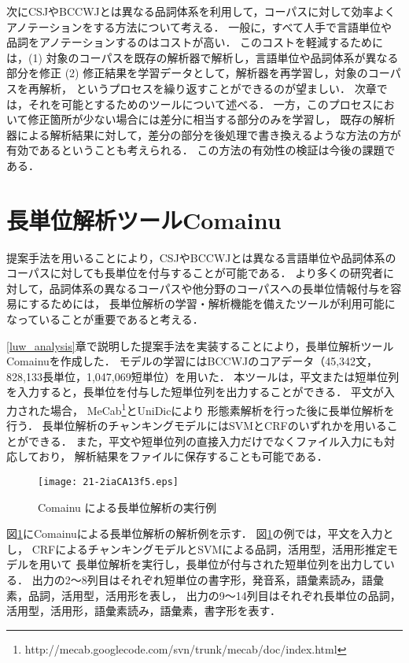 \documentclass[japanese]{jnlp_1.4}
\begin{document}
次にCSJやBCCWJとは異なる品詞体系を利用して，コーパスに対して効率よくアノテーションをする方法について考える．
一般に，すべて人手で言語単位や品詞をアノテーションするのはコストが高い．
このコストを軽減するためには，(1) 対象のコーパスを既存の解析器で解析し，言語単位や品詞体系が異なる部分を修正
(2) 修正結果を学習データとして，解析器を再学習し，対象のコーパスを再解析，
というプロセスを繰り返すことができるのが望ましい．
次章では，それを可能とするためのツールについて述べる．
一方，このプロセスにおいて修正箇所が少ない場合には差分に相当する部分のみを学習し，
既存の解析器による解析結果に対して，差分の部分を後処理で書き換えるような方法の方が有効であるということも考えられる．
この方法の有効性の検証は今後の課題である．


\section{長単位解析ツールComainu}
\label{comainu}

提案手法を用いることにより，CSJやBCCWJとは異なる言語単位や品詞体系のコーパスに対しても長単位を付与することが可能である．
より多くの研究者に対して，品詞体系の異なるコーパスや他分野のコーパスへの長単位情報付与を容易にするためには，
長単位解析の学習・解析機能を備えたツールが利用可能になっていることが重要であると考える．

\ref{luw_analysis}章で説明した提案手法を実装することにより，長単位解析ツールComainuを作成した．
モデルの学習にはBCCWJのコアデータ（45,342文，828,133長単位，1,047,069短単位）を用いた．
本ツールは，平文または短単位列を入力すると，長単位を付与した短単位列を出力することができる．
平文が入力された場合，
MeCab\footnote{http://mecab.googlecode.com/svn/trunk/mecab/doc/index.html}とUniDicにより
形態素解析を行った後に長単位解析を行う．
長単位解析のチャンキングモデルにはSVMとCRFのいずれかを用いることができる．
また，平文や短単位列の直接入力だけでなくファイル入力にも対応しており，
解析結果をファイルに保存することも可能である．

\begin{figure}[b]
\begin{center}
\texttt{[image: 21-2iaCA13f5.eps]}
\end{center}
\caption{Comainu による長単位解析の実行例}
\label{comainu_sample}
\end{figure}

図\ref{comainu_sample}にComainuによる長単位解析の解析例を示す．
図\ref{comainu_sample}の例では，平文を入力とし，
CRFによるチャンキングモデルとSVMによる品詞，活用型，活用形推定モデルを用いて
長単位解析を実行し，長単位が付与された短単位列を出力している．
出力の2〜8列目はそれぞれ短単位の書字形，発音系，語彙素読み，語彙素，品詞，活用型，活用形を表し，
出力の9〜14列目はそれぞれ長単位の品詞，活用型，活用形，語彙素読み，語彙素，書字形を表す．
\end{document}
